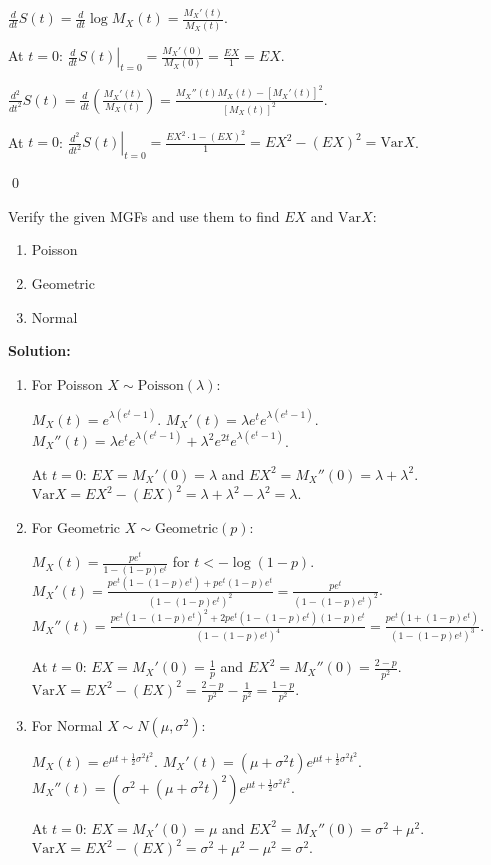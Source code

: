 $\frac{d}{dt}S(t) = \frac{d}{dt}\log M_X(t) = \frac{M_X'(t)}{M_X(t)}$.

At $t=0$: $\left.\frac{d}{dt}S(t)\right|_{t=0} = \frac{M_X'(0)}{M_X(0)} = \frac{EX}{1} = EX$.

$\frac{d^2}{dt^2}S(t) = \frac{d}{dt}\left(\frac{M_X'(t)}{M_X(t)}\right) = \frac{M_X''(t)M_X(t) - [M_X'(t)]^2}{[M_X(t)]^2}$.

At $t=0$: $\left.\frac{d^2}{dt^2}S(t)\right|_{t=0} = \frac{EX^2 \cdot 1 - (EX)^2}{1} = EX^2 - (EX)^2 = \text{Var}X$.


\qed
\begin{problembox}
Verify the given MGFs and use them to find $EX$ and $\text{Var}X$:
\begin{enumerate}[label=(\alph*)]
    \item Poisson
    \item Geometric
    \item Normal
\end{enumerate}
\end{problembox}

\noindent\textbf{Solution:}
\begin{enumerate}[label=(\alph*)]
    \item For Poisson $X \sim \text{Poisson}(\lambda)$:
    
    $M_X(t) = e^{\lambda(e^t-1)}$.
    $M_X'(t) = \lambda e^t e^{\lambda(e^t-1)}$.
    $M_X''(t) = \lambda e^t e^{\lambda(e^t-1)} + \lambda^2 e^{2t} e^{\lambda(e^t-1)}$.
    
    At $t=0$: $EX = M_X'(0) = \lambda$ and $EX^2 = M_X''(0) = \lambda + \lambda^2$.
    $\text{Var}X = EX^2 - (EX)^2 = \lambda + \lambda^2 - \lambda^2 = \lambda$.
    
    \item For Geometric $X \sim \text{Geometric}(p)$:
    
    $M_X(t) = \frac{pe^t}{1-(1-p)e^t}$ for $t < -\log(1-p)$.
    $M_X'(t) = \frac{pe^t(1-(1-p)e^t) + pe^t(1-p)e^t}{(1-(1-p)e^t)^2} = \frac{pe^t}{(1-(1-p)e^t)^2}$.
    $M_X''(t) = \frac{pe^t(1-(1-p)e^t)^2 + 2pe^t(1-(1-p)e^t)(1-p)e^t}{(1-(1-p)e^t)^4} = \frac{pe^t(1+(1-p)e^t)}{(1-(1-p)e^t)^3}$.
    
    At $t=0$: $EX = M_X'(0) = \frac{1}{p}$ and $EX^2 = M_X''(0) = \frac{2-p}{p^2}$.
    $\text{Var}X = EX^2 - (EX)^2 = \frac{2-p}{p^2} - \frac{1}{p^2} = \frac{1-p}{p^2}$.
    
    \item For Normal $X \sim N(\mu,\sigma^2)$:
    
    $M_X(t) = e^{\mu t + \frac{1}{2}\sigma^2 t^2}$.
    $M_X'(t) = (\mu + \sigma^2 t)e^{\mu t + \frac{1}{2}\sigma^2 t^2}$.
    $M_X''(t) = (\sigma^2 + (\mu + \sigma^2 t)^2)e^{\mu t + \frac{1}{2}\sigma^2 t^2}$.
    
    At $t=0$: $EX = M_X'(0) = \mu$ and $EX^2 = M_X''(0) = \sigma^2 + \mu^2$.
    $\text{Var}X = EX^2 - (EX)^2 = \sigma^2 + \mu^2 - \mu^2 = \sigma^2$.
\end{enumerate}


